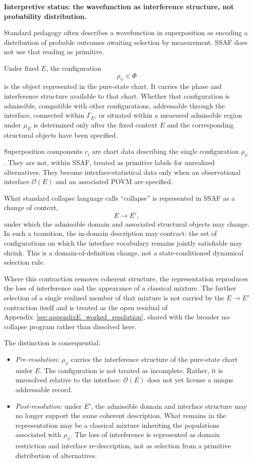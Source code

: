 \documentclass[aps,prx,onecolumn,11pt]{revtex4-2}
\theoremstyle{plain}
\theoremstyle{definition}
\theoremstyle{remark}
\begin{document}
\medskip
\noindent\textbf{Interpretive status: the wavefunction as interference structure, not probability distribution.}

Standard pedagogy often describes a wavefunction in superposition as
encoding a distribution of probable outcomes awaiting selection by
measurement. SSAF does not use that reading as primitive.

Under fixed \(E\), the configuration
\[
\rho_\psi\in\Phi
\]
is the object represented in the pure-state chart. It carries the phase
and interference structure available to that chart. Whether that
configuration is admissible, compatible with other configurations,
addressable through the interface, connected within \(\Gamma_E\), or
situated within a measured admissible region under \(\mu_E\) is
determined only after the fixed context \(E\) and the corresponding
structural objects have been specified.

Superposition components \(c_i\) are chart data describing the single
configuration \(\rho_\psi\). They are not, within SSAF, treated as
primitive labels for unrealized alternatives. They become
interface-statistical data only when an observational interface
\(\mathcal O(E)\) and an associated POVM are specified.

What standard collapse language calls ``collapse'' is represented in
SSAF as a change of context,
\[
E\to E',
\]
under which the admissible domain and associated structural objects may
change. In such a transition, the in-domain description may contract:
the set of configurations on which the interface vocabulary remains
jointly satisfiable may shrink. This is a domain-of-definition change,
not a state-conditioned dynamical selection rule.

Where this contraction removes coherent structure, the representation
reproduces the loss of interference and the appearance of a classical
mixture. The further selection of a single realized member of that
mixture is not carried by the \(E\to E'\) contraction itself and is
treated as the open residual of
Appendix~\ref{sec:appendixE_worked_resolution}, shared with the broader
no-collapse program rather than dissolved here.

The distinction is consequential:

\begin{itemize}

\item \emph{Pre-resolution:}
\(\rho_\psi\) carries the interference structure of the pure-state
chart under \(E\). The configuration is not treated as incomplete.
Rather, it is unresolved relative to the interface: \(\mathcal O(E)\)
does not yet license a unique addressable record.

\item \emph{Post-resolution:}
under \(E'\), the admissible domain and interface structure may no
longer support the same coherent description. What remains in the
representation may be a classical mixture inheriting the populations
associated with \(\rho_\psi\). The loss of interference is represented
as domain restriction and interface re-description, not as selection
from a primitive distribution of alternatives.

\end{itemize}
\end{document}
